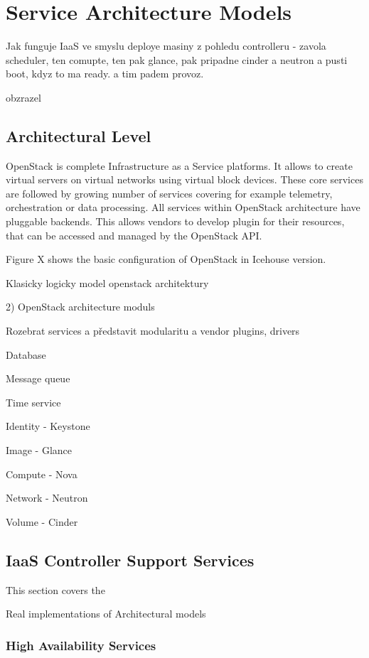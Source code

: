 
\section{Service Architecture Models}

Jak funguje IaaS ve smyslu deploye masiny z pohledu controlleru - zavola scheduler, ten comupte, ten pak glance, pak pripadne cinder a neutron a pusti boot, kdyz to ma ready. a tim padem provoz.

obzrazel

\subsection{Architectural Level}

OpenStack is complete Infrastructure as a Service platforms. It allows to create virtual servers on virtual networks using virtual block devices. These core services are followed by growing number of services covering for example telemetry, orchestration or data processing. All services within OpenStack architecture have pluggable backends. This allows vendors to develop plugin for their resources, that can be accessed and managed by the OpenStack API.

Figure X shows the basic configuration of OpenStack in Icehouse version.

Klasicky logicky model openstack architektury

2) OpenStack architecture moduls

Rozebrat services a představit modularitu a vendor plugins, drivers

Database

Message queue

Time service

Identity - Keystone

Image - Glance

Compute - Nova

Network - Neutron

Volume - Cinder

\subsection{IaaS Controller Support Services}

This section covers the 

Real implementations of Architectural models

\subsubsection{High Availability Services}

